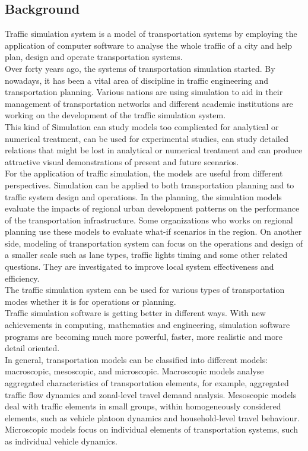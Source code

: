 \documentclass[a4paper,12pt]{article}
\begin{document}
\subsection{Background}
Traffic simulation system is a model of transportation systems by employing the application of computer software to analyse the whole traffic of a city and help plan, design and operate transportation systems.\\
Over forty years ago, the systems of transportation simulation started. By nowadays, it has been a vital area of discipline in traffic engineering and transportation planning. Various nations are using simulation to aid in their management of transportation networks and different academic institutions are working on the development of the traffic simulation system.\\
This kind of Simulation can study models too complicated for analytical or numerical treatment, can be used for experimental studies, can study detailed relations that might be lost in analytical or numerical treatment and can produce attractive visual demonstrations of present and future scenarios.\\
For the application of traffic simulation, the models are useful from different perspectives. Simulation can be applied to both transportation planning and to traffic system design and operations. In the planning, the simulation models evaluate the impacts of regional urban development patterns on the performance of the transportation infrastructure. Some organizations who works on regional planning use these models to evaluate what-if scenarios in the region. On another side, modeling of transportation system can focus on the operations and design of a smaller scale such as lane types, traffic lights timing and some other related questions. They are investigated to improve local system effectiveness and efficiency.\\
The traffic simulation system can be used for various types of transportation modes whether it is for operations or planning.\\
Traffic simulation software is getting better in different ways. With new achievements in computing, mathematics and engineering, simulation software programs are becoming much more powerful, faster, more realistic and more detail oriented.\\
In general, transportation models can be classified into different models: macroscopic, mesoscopic, and microscopic. Macroscopic models analyse aggregated characteristics of transportation elements, for example, aggregated traffic flow dynamics and zonal-level travel demand analysis. Mesoscopic models deal with traffic elements in small groups, within homogeneously considered elements, such as vehicle platoon dynamics and household-level travel behaviour. Microscopic models focus on individual elements of transportation systems, such as individual vehicle dynamics.
\end{document}
